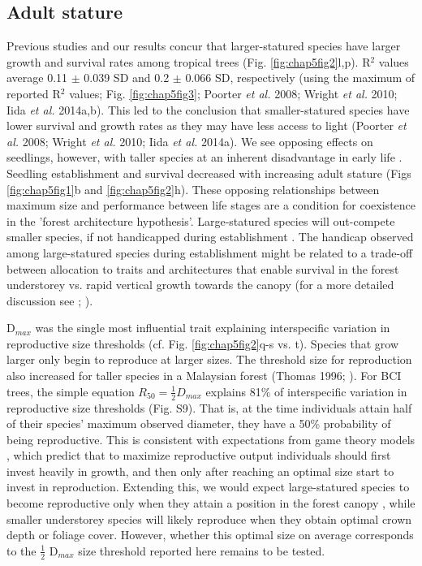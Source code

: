 \documentclass[b5paper,justified]{tufte-book} %
\begin{document}
\begin{fullwidth}
\subsection{Adult stature}
Previous studies and our results concur that larger-statured species have larger growth and survival rates among tropical trees (Fig. \ref{fig:chap5fig2}l,p). R$^2$ values average 0.11 $\pm$ 0.039 SD and 0.2 $\pm$ 0.066 SD, respectively (using the maximum of reported R$^2$ values; Fig. \ref{fig:chap5fig3}; Poorter \emph{\emph{et al.}} 2008; Wright \emph{et al.} 2010; Iida \emph{et al.} 2014a,b). This led to the conclusion that smaller-statured species have lower survival and growth rates as they may have less access to light (Poorter \emph{et al.} 2008; Wright \emph{et al.} 2010; Iida \emph{et al.} 2014a). We see opposing effects on seedlings, however, with taller species at an inherent disadvantage in early life \citep{King2005a}. Seedling establishment and survival decreased with increasing adult stature (Figs \ref{fig:chap5fig1}b and \ref{fig:chap5fig2}h). These opposing relationships between maximum size and performance between life stages are a condition for coexistence in the 'forest architecture hypothesis'. Large-statured species will out-compete smaller species, if not handicapped during establishment \citep{Kohyama1993}. The handicap observed among large-statured species during establishment might be related to a trade-off between allocation to traits and architectures that enable survival in the forest understorey vs. rapid vertical growth towards the canopy (for a more detailed discussion see \citealt{Kohyama2003}; \citealt{Poorter2005}).


D$_{max}$ was the single most influential trait explaining interspecific variation in reproductive size thresholds (cf. Fig. \ref{fig:chap5fig2}q-s vs. t). Species that grow larger only begin to reproduce at larger sizes. The threshold size for reproduction also increased for taller species in a Malaysian forest (Thomas 1996; \citealt{Davies1999}). For BCI trees, the simple equation $R_{50} = \frac{1}{2}D_{max}$ explains 81\% of interspecific variation in reproductive size thresholds (Fig. S9). That is, at the time individuals attain half of their species' maximum observed diameter, they have a 50\% probability of being reproductive. This is consistent with expectations from game
theory models \citep[reviewed by][]{Falster2003}, which predict that to maximize reproductive output individuals
should first invest heavily in growth, and then only after reaching an optimal size start to invest in reproduction.
Extending this, we would expect large-statured species to become reproductive only when they attain a position in the
forest canopy \citep{Thomas1996a, Zuidema2002}, while smaller understorey species will likely reproduce when they
obtain optimal crown depth \citep{Kohyama2003} or foliage cover. However, whether this optimal size on average
corresponds to the $\frac{1}{2}$ D$_{max}$ size threshold reported here remains to be tested.


\end{fullwidth}
\end{document}
